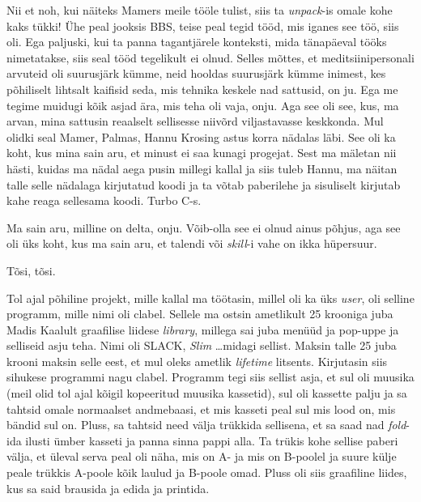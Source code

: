 Nii et noh, kui näiteks Mamers meile tööle tulist, siis ta \emph{unpack}-is omale kohe kaks tükki! Ühe peal jooksis BBS, teise peal tegid tööd, mis iganes see töö, siis oli. Ega paljuski, kui ta panna tagantjärele konteksti, mida tänapäeval tööks nimetatakse, siis seal tööd tegelikult ei olnud. Selles mõttes, et meditsiinipersonali arvuteid oli suurusjärk kümme, neid hooldas suurusjärk kümme inimest, kes põhiliselt lihtsalt kaifisid seda, mis tehnika keskele nad sattusid, on ju. Ega me tegime muidugi kõik asjad ära, mis  teha oli vaja, onju. Aga see oli see, kus, ma arvan, mina sattusin reaalselt sellisesse niivõrd viljastavasse keskkonda. Mul olidki seal Mamer, Palmas, Hannu Krosing astus korra nädalas läbi. See oli ka koht, kus mina sain aru, et minust ei saa kunagi progejat. Sest ma mäletan nii hästi, kuidas ma nädal aega pusin millegi kallal ja siis tuleb Hannu, ma näitan talle selle nädalaga kirjutatud koodi ja ta võtab paberilehe ja sisuliselt kirjutab kahe reaga sellesama koodi. Turbo C-s.


Ma sain aru, milline on delta, onju. Võib-olla see ei olnud ainus põhjus, aga see oli üks koht, kus ma sain aru, et talendi või \emph{skill}-i vahe on ikka hüpersuur.


Tõsi, tõsi.

Tol ajal põhiline projekt, mille kallal ma töötasin, millel oli ka üks \emph{user}, oli selline programm, mille nimi oli clabel. Sellele ma ostsin ametlikult 25 krooniga juba Madis Kaalult graafilise liidese \emph{library}, millega sai juba menüüd ja pop-uppe ja selliseid asju teha. Nimi oli SLACK, \emph{Slim} \ldots midagi sellist. Maksin talle 25 juba krooni maksin selle eest, et mul oleks ametlik \emph{lifetime} litsents. Kirjutasin siis sihukese programmi nagu clabel. Programm tegi siis sellist asja, et sul oli muusika (meil olid tol ajal kõigil kopeeritud muusika kassetid), sul oli kassette palju ja sa tahtsid omale normaalset andmebaasi, et mis kasseti peal sul mis lood on, mis bändid sul on. Pluss, sa tahtsid need välja trükkida sellisena, et sa saad nad \emph{fold}-ida ilusti ümber kasseti ja panna sinna pappi alla. Ta trükis kohe sellise paberi välja, et üleval serva peal oli näha, mis on A- ja mis on B-poolel ja suure külje peale trükkis A-poole kõik laulud ja B-poole omad. Pluss oli siis graafiline liides, kus sa said brausida ja edida ja printida. 

